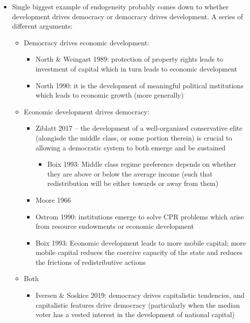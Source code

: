 \documentclass[12pt]{article}
\begin{document}
\begin{itemize}
    \item Single biggest example of endogeneity probably comes down to whether development drives democracy or democracy drives development. A series of different arguments:
    \begin{itemize}
        \item Democracy drives economic development:
        \begin{itemize}
            \item North \& Weingast 1989: protection of property rights leads to investment of capital which in turn leads to economic development
            \item North 1990: it is the development of meaningful political institutions which leads to economic growth (more generally)
        \end{itemize}
        \item Economic development drives democracy:
        \begin{itemize}
            \item Ziblatt 2017 -- the development of a well-organized conservative elite (alongisde the middle class, or some portion therein) is crucial to allowing a democratic system to both emerge and be sustained
            \begin{itemize}
                \item Boix 1993: Middle class regime preference depends on whether they are above or below the average income (such that redistribution will be either towards or away from them)
            \end{itemize}
            \item Moore 1966
            \item Ostrom 1990: institutions emerge to solve CPR problems which arise from resource endowments or economic development
            \item Boix 1993: Economic development leads to more mobile capital; more mobile capital reduces the coercive capacity of the state and reduces the frictions of redistributive actions
        \end{itemize}
        \item Both
        \begin{itemize}
            \item Iversen \& Soskice 2019: democracy drives capitalistic tendencies, and capitalistic features drive democracy (particularly when the median voter has a vested interest in the development of national capital)

\end{itemize}
\end{itemize}
\end{itemize}
\end{document}
